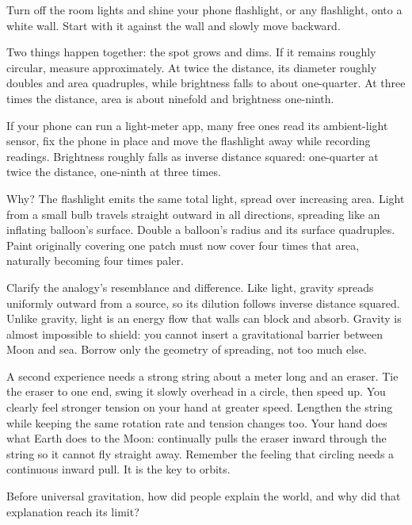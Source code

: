 \begin{experiment}
Turn off the room lights and shine your phone flashlight, or any flashlight, onto a white wall. Start with it against the wall and slowly move backward.

Two things happen together: the spot grows and dims. If it remains roughly circular, measure approximately. At twice the distance, its diameter roughly doubles and area quadruples, while brightness falls to about one-quarter. At three times the distance, area is about ninefold and brightness one-ninth.

If your phone can run a light-meter app, many free ones read its ambient-light sensor, fix the phone in place and move the flashlight away while recording readings. Brightness roughly falls as inverse distance squared: one-quarter at twice the distance, one-ninth at three times.

Why? The flashlight emits the same total light, spread over increasing area. Light from a small bulb travels straight outward in all directions, spreading like an inflating balloon's surface. Double a balloon's radius and its surface quadruples. Paint originally covering one patch must now cover four times that area, naturally becoming four times paler.

Clarify the analogy's resemblance and difference. Like light, gravity spreads uniformly outward from a source, so its dilution follows inverse distance squared. Unlike gravity, light is an energy flow that walls can block and absorb. Gravity is almost impossible to shield: you cannot insert a gravitational barrier between Moon and sea. Borrow only the geometry of spreading, not too much else.
\end{experiment}

A second experience needs a strong string about a meter long and an eraser. Tie the eraser to one end, swing it slowly overhead in a circle, then speed up. You clearly feel stronger tension on your hand at greater speed. Lengthen the string while keeping the same rotation rate and tension changes too. Your hand does what Earth does to the Moon: continually pulls the eraser inward through the string so it cannot fly straight away. Remember the feeling that circling needs a continuous inward pull. It is the key to orbits.


Before universal gravitation, how did people explain the world, and why did that explanation reach its limit?

